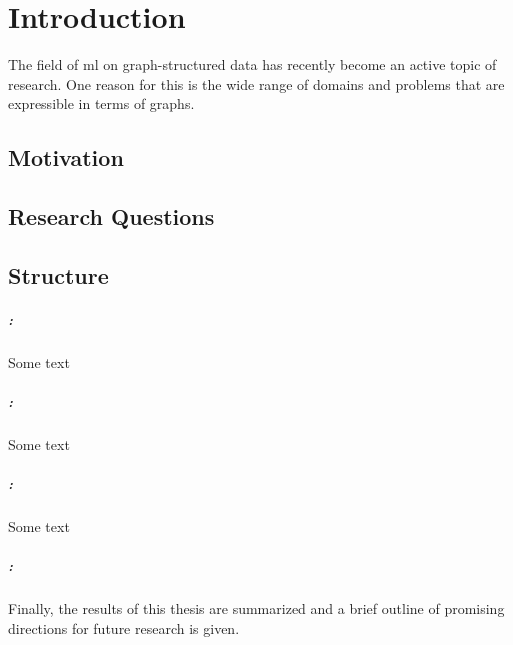 \chapter{Introduction}%
\label{sec:intro}

\setcounter{page}{1}			%

The field of \acs{ml} on graph-structured data has recently become an active topic of research.
One reason for this is the wide range of domains and problems that are expressible in terms of graphs.


\section{Motivation}%
\label{sec:intro:motivation}



\section{Research Questions}%
\label{sec:intro:questions}


\section{Structure}%
\label{sec:intro:structure}

\paragraph{: }
Some text
\paragraph{: }
Some text
\paragraph{: }
Some text
\paragraph{: }
Finally, the results of this thesis are summarized and a brief outline of promising directions for future research is given.
